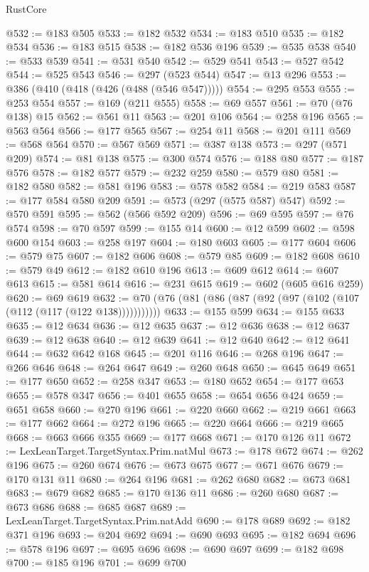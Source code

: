 \begin{lexlean}{RustCore}
\begin{coremodule}
@532 := @183 @505
@533 := @182 @532
@534 := @183 @510
@535 := @182 @534
@536 := @183 @515
@538 := @182 @536 @196
@539 := @535 @538
@540 := @533 @539
@541 := @531 @540
@542 := @529 @541
@543 := @527 @542
@544 := @525 @543
@546 := @297 (@523 @544)
@547 := @13 @296
@553 := @386 (@410 (@418 (@426 (@488 (@546 @547)))))
@554 := @295 @553
@555 := @253 @554
@557 := @169 (@211 @555)
@558 := @69 @557
@561 := @70 (@76 @138) @15
@562 := @561 @11
@563 := @201 @106
@564 := @258 @196
@565 := @563 @564
@566 := @177 @565
@567 := @254 @11
@568 := @201 @111
@569 := @568 @564
@570 := @567 @569
@571 := @387 @138
@573 := @297 (@571 @209)
@574 := @81 @138
@575 := @300 @574
@576 := @188 @80
@577 := @187 @576
@578 := @182 @577
@579 := @232 @259
@580 := @579 @80
@581 := @182 @580
@582 := @581 @196
@583 := @578 @582
@584 := @219 @583
@587 := @177 @584 @580 @209
@591 := @573 (@297 (@575 @587) @547)
@592 := @570 @591
@595 := @562 (@566 @592 @209)
@596 := @69 @595
@597 := @76 @574
@598 := @70 @597
@599 := @155 @14
@600 := @12 @599
@602 := @598 @600 @154
@603 := @258 @197
@604 := @180 @603
@605 := @177 @604
@606 := @579 @75
@607 := @182 @606
@608 := @579 @85
@609 := @182 @608
@610 := @579 @49
@612 := @182 @610 @196
@613 := @609 @612
@614 := @607 @613
@615 := @581 @614
@616 := @231 @615
@619 := @602 (@605 @616 @259)
@620 := @69 @619
@632 := @70 (@76 (@81 (@86 (@87 (@92 (@97 (@102 (@107 (@112 (@117 (@122 @138)))))))))))
@633 := @155 @599
@634 := @155 @633
@635 := @12 @634
@636 := @12 @635
@637 := @12 @636
@638 := @12 @637
@639 := @12 @638
@640 := @12 @639
@641 := @12 @640
@642 := @12 @641
@644 := @632 @642 @168
@645 := @201 @116
@646 := @268 @196
@647 := @266 @646
@648 := @264 @647
@649 := @260 @648
@650 := @645 @649
@651 := @177 @650
@652 := @258 @347
@653 := @180 @652
@654 := @177 @653
@655 := @578 @347
@656 := @401 @655
@658 := @654 @656 @424
@659 := @651 @658
@660 := @270 @196
@661 := @220 @660
@662 := @219 @661
@663 := @177 @662
@664 := @272 @196
@665 := @220 @664
@666 := @219 @665
@668 := @663 @666 @355
@669 := @177 @668
@671 := @170 @126 @11
@672 := LexLeanTarget.TargetSyntax.Prim.natMul
@673 := @178 @672
@674 := @262 @196
@675 := @260 @674
@676 := @673 @675
@677 := @671 @676
@679 := @170 @131 @11
@680 := @264 @196
@681 := @262 @680
@682 := @673 @681
@683 := @679 @682
@685 := @170 @136 @11
@686 := @260 @680
@687 := @673 @686
@688 := @685 @687
@689 := LexLeanTarget.TargetSyntax.Prim.natAdd
@690 := @178 @689
@692 := @182 @371 @196
@693 := @204 @692
@694 := @690 @693
@695 := @182 @694
@696 := @578 @196
@697 := @695 @696
@698 := @690 @697
@699 := @182 @698
@700 := @185 @196
@701 := @699 @700

\end{coremodule}
\end{lexlean}
